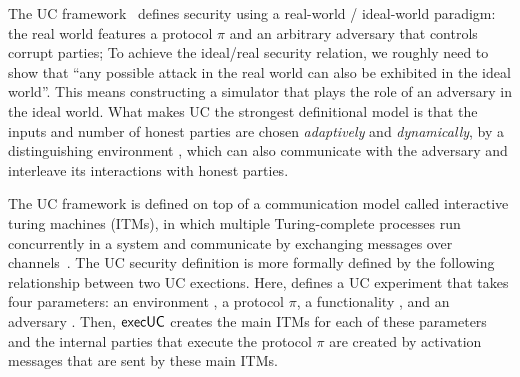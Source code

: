 The UC framework~\cite{canettiUC} defines security using
a real-world / ideal-world paradigm:
the real world features a protocol $\pi$ and an arbitrary adversary \A that controls corrupt parties;
To achieve the ideal/real security relation, we roughly need to show that ``any possible attack in the real world can also be exhibited
in the ideal world''.
This means constructing a simulator \Sim that plays the role of an adversary in the ideal world.
What makes UC the strongest definitional model is that the inputs and number of honest parties are chosen \emph{adaptively}
and \emph{dynamically}, by a distinguishing environment \Z, which can also communicate with the adversary and interleave its interactions with honest parties.

The UC framework is defined on top of a communication model called interactive turing machines (ITMs), in which multiple Turing-complete processes run concurrently in a system and communicate by exchanging messages over channels~\cite{canettiUC}.
The UC security definition is more formally defined by the following relationship between two UC exections. 
Here,  defines a UC experiment that takes four parameters: an environment \Z, a protocol $\pi$, a functionality \F, and an adversary \A.
Then, $\mathsf{execUC}$ creates the main ITMs for each of these parameters and the internal parties that execute the protocol $\pi$ are created by
activation messages that are sent by these main ITMs.

